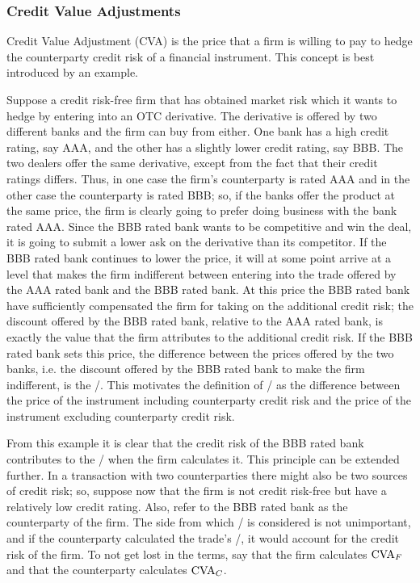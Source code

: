\documentclass[main.tex]{subfiles}
\begin{document}
    \subsubsection{Credit Value Adjustments}
        Credit Value Adjustment (CVA) is the price that a firm is willing to pay 
        to hedge the counterparty credit risk of a financial instrument.
        This concept is best introduced by an example. 
        
        \begin{example}
        Suppose a credit risk-free firm that has obtained market risk 
        which it wants to hedge by entering into an OTC derivative.
        The derivative is offered by two different banks and the firm can buy from either.
        One bank has a high credit rating, say AAA, and the other has a slightly lower credit rating, say BBB. 
        The two dealers offer the same derivative, except from the fact that their credit ratings differs.
        Thus, in one case the firm's counterparty is rated AAA and in the other case the counterparty is rated BBB;
        so, if the banks offer the product at the same price, 
        the firm is clearly going to prefer doing business with the bank rated AAA.
        Since the BBB rated bank wants to be competitive and win the deal,
        it is going to submit a lower ask on the derivative than its competitor.
        If the BBB rated bank continues to lower the price, it will at some point arrive at a level
        that makes the firm indifferent between entering into the trade 
        offered by the AAA rated bank and the BBB rated bank.
        At this price the BBB rated bank have sufficiently compensated the firm for taking on the additional credit risk;
        the discount offered by the BBB rated bank, relative to the AAA rated bank, is exactly the value that the firm
        attributes to the additional credit risk. 
        If the BBB rated bank sets this price, the difference between the prices offered by the two banks,
        i.e. the discount offered by the BBB rated bank to make the firm indifferent, is the \CVA/.
        This motivates the definition of \CVA/ as the difference between the price of the instrument 
        including counterparty credit risk and the price of the instrument excluding counterparty credit risk.
        \end{example}

        From this example it is clear that the credit risk of the BBB rated bank contributes to the \CVA/
        when the firm calculates it.
        This principle can be extended further.
        In a transaction with two counterparties there might also be two sources of credit risk;
        so, suppose now that the firm is not credit risk-free but have a relatively low credit rating.
        Also, refer to the BBB rated bank as the counterparty of the firm.
        The side from which \CVA/ is considered is not unimportant,
        and if the counterparty calculated the trade's \CVA/, it would account for the credit risk of the firm.
        To not get lost in the terms, say that the firm calculates $\CVA/_{F}$ 
        and that the counterparty calculates $\CVA/_{C}$.
\end{document}
